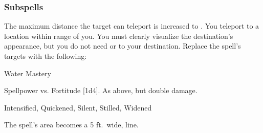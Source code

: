\subsubsection{Subspells}
The maximum distance the target can teleport is increased to \rngext.
You teleport to a location within \rngext range of you.
You must clearly visualize the destination's appearance, but you do not need  or  to your destination.
Replace the spell's targets with the following:
\begin{spellcontent}
\begin{augmenttargetinginfo}
\end{augmenttargetinginfo}
\end{spellcontent}
\begin{spellsection}{Water Mastery}
\begin{spellheader}
\end{spellheader}
\begin{spellcontent}
\begin{spelltargetinginfo}
\end{spelltargetinginfo}
\begin{spelleffects}
\begin{spellattack}{Spellpower vs. Fortitude}
\spellsuccess {}[1d4].
\spellcritical As above, but double damage.
\end{spellattack}
\end{spelleffects}
\end{spellcontent}
\begin{spellfooter}
 Intensified, Quickened, Silent, Stilled, Widened
\end{spellfooter}
\begin{spellsubcontent}
\begin{spellcantrip}
The spell's area becomes a 5 ft.\ wide, \areamed line.
\end{spellcantrip}
\end{spellsubcontent}
\end{spellsection}
